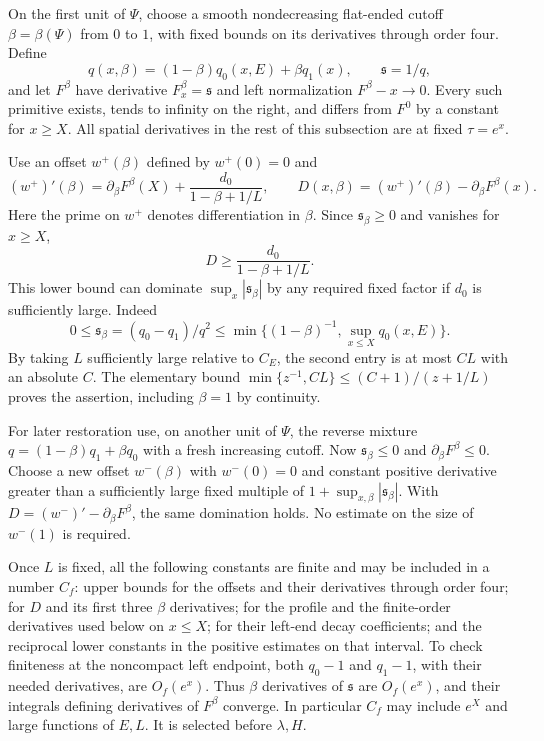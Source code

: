 On the first unit of $\Psi$, choose a smooth nondecreasing flat-ended cutoff $\beta=\beta(\Psi)$ from $0$ to $1$, with fixed bounds on its derivatives through order four. Define
\begin{equation}\label{center:forward-profile}
 q(x,\beta)=(1-\beta)q_0(x,E)+\beta q_1(x),\qquad
 \mathfrak s=1/q,
\end{equation}
and let $F^\beta$ have derivative $F^\beta_x=\mathfrak s$ and left normalization $F^\beta-x\to0$. Every such primitive exists, tends to infinity on the right, and differs from $F^0$ by a constant for $x\ge X$. All spatial derivatives in the rest of this subsection are at fixed $\tau=e^x$.

Use an offset $w^+(\beta)$ defined by $w^+(0)=0$ and
\begin{equation}\label{center:offset-definition}
 (w^+)'(\beta)=\partial_\beta F^\beta(X)
                  +\frac{d_0}{1-\beta+1/L},\qquad
 D(x,\beta)=(w^+)'(\beta)-\partial_\beta F^\beta(x).
\end{equation}
Here the prime on $w^+$ denotes differentiation in $\beta$. Since $\mathfrak s_\beta\ge0$ and vanishes for $x\ge X$,
\begin{equation}\label{center:D-domination}
 D\ge\frac{d_0}{1-\beta+1/L}.
\end{equation}
This lower bound can dominate $\sup_x|\mathfrak s_\beta|$ by any required fixed factor if $d_0$ is sufficiently large. Indeed
\[
 0\le\mathfrak s_\beta=(q_0-q_1)/q^2
 \le\min\{(1-\beta)^{-1},\sup_{x\le X}q_0(x,E)\}.
\]
By taking $L$ sufficiently large relative to $C_E$, the second entry is at most $CL$ with an absolute $C$. The elementary bound
$\min\{z^{-1},CL\}\le(C+1)/(z+1/L)$ proves the assertion, including $\beta=1$ by continuity.

For later restoration use, on another unit of $\Psi$, the reverse mixture $q=(1-\beta)q_1+\beta q_0$ with a fresh increasing cutoff. Now $\mathfrak s_\beta\le0$ and $\partial_\beta F^\beta\le0$. Choose a new offset $w^-(\beta)$ with $w^-(0)=0$ and constant positive derivative greater than a sufficiently large fixed multiple of $1+\sup_{x,\beta}|\mathfrak s_\beta|$. With $D=(w^-)'-\partial_\beta F^\beta$, the same domination holds. No estimate on the size of $w^-(1)$ is required.

Once $L$ is fixed, all the following constants are finite and may be included in a number $C_f$: upper bounds for the offsets and their derivatives through order four; for $D$ and its first three $\beta$ derivatives; for the profile and the finite-order derivatives used below on $x\le X$; for their left-end decay coefficients; and the reciprocal lower constants in the positive estimates on that interval. To check finiteness at the noncompact left endpoint, both $q_0-1$ and $q_1-1$, with their needed derivatives, are $O_f(e^x)$. Thus $\beta$ derivatives of $\mathfrak s$ are $O_f(e^x)$, and their integrals defining derivatives of $F^\beta$ converge. In particular $C_f$ may include $e^X$ and large functions of $E,L$. It is selected before $\lambda,H$.

